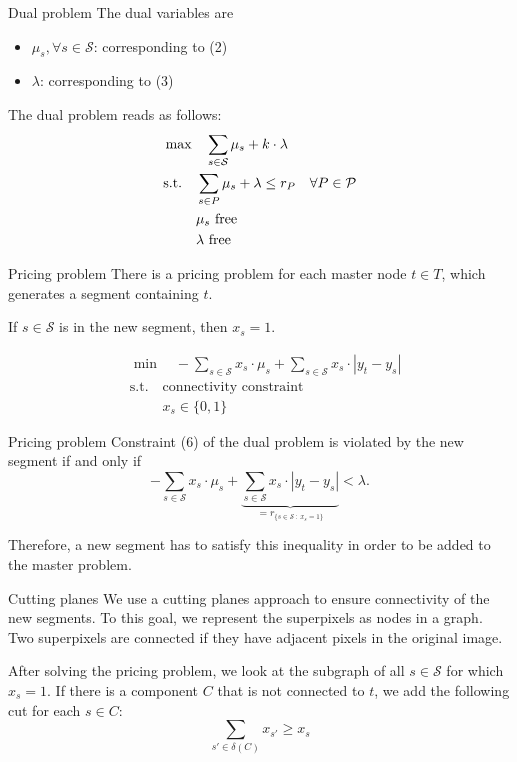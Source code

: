 \documentclass[fleqn]{beamer}
\newcommand{\superpixels}{\mathcal{S}}
\begin{document}
	\begin{frame}{Dual problem}
		The dual variables are
		\begin{itemize}
			\item $\mu_s, \forall s\in\superpixels$: corresponding to (2)
			\item $\lambda$: corresponding to (3)
		\end{itemize}
		
		The dual problem reads as follows:
		\begin{align}
		    &\max\quad \smashoperator{\sum_{s\in\superpixels}} \mu_s + k\cdot\lambda \\
		    &\text{s.t.}\quad \sum_{s\in P} \mu_s + \lambda \leq r_P \quad\forall P\in\mathcal{P} \\
		    &\phantom{\text{s.t.}\quad} \mu_s \text{ free} \\
		    &\phantom{\text{s.t.}\quad} \lambda \text{ free}
		\end{align}
	\end{frame}
	
	\begin{frame}{Pricing problem}
		There is a pricing problem for each master node $t\in T$,
		which generates a segment containing $t$.
		
		If $s\in\superpixels$ is in the new segment, then $x_s=1$.		
		 
		\begin{align}
    		&\min\quad -\sum_{s\in\superpixels} x_s\cdot\mu_s + \sum_{s\in\superpixels} x_s\cdot|y_t-y_s| \\
    		&\text{s.t.}\quad \text{connectivity constraint} \\
	    	&\phantom{\text{s.t.}\quad} x_s \in\{0,1\}
		\end{align}
	\end{frame}
	
	\begin{frame}{Pricing problem}
		Constraint (6) of the dual problem is violated by the new segment if and only if
		\[-\sum_{s\in\superpixels} x_s\cdot\mu_s + \underbrace{\sum_{s\in\superpixels} x_s\cdot|y_t-y_s|}_{=r_{\{s\in\superpixels\ :\ x_s=1\}}} < \lambda.\]
        
		Therefore, a new segment has to satisfy this inequality in order to be added to the master problem.
	\end{frame}
    
	\begin{frame}{Cutting planes}
		We use a cutting planes approach to ensure connectivity of the new segments.
        To this goal, we represent the superpixels as nodes in a graph.
        Two superpixels are connected if they have adjacent pixels in the original image.
		
		After solving the pricing problem,
		we look at the subgraph of all $s\in\superpixels$ for which $x_s=1$.
		If there is a component $C$ that is not connected to $t$,
		we add the following cut for each $s\in C$:
		\[\sum_{s'\in\delta(C)}x_{s'} \geq x_s\]
	\end{frame}
\end{document}
